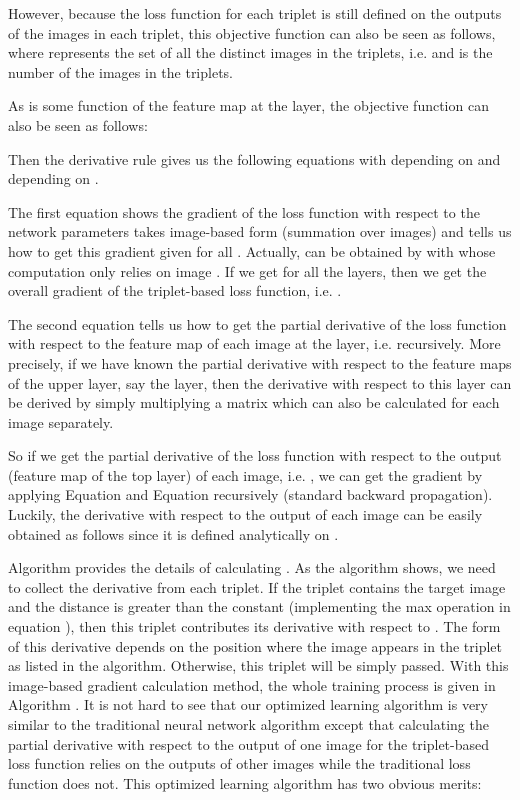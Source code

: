 \documentclass[review]{elsarticle}
\begin{document}
However, because the loss function for each triplet is still defined on the outputs of the images in each triplet, this objective function can also be seen as follows, where  represents the set of all the distinct images in the triplets, i.e.  and  is the number of the images in the triplets.


As  is some function of the feature map  at the  layer, the objective function can also be seen as follows:


Then the derivative rule gives us the following equations with  depending on  and  depending on .




The first equation shows the gradient of the loss function with respect to the network parameters takes image-based form (summation over images) and tells us how to get this gradient given  for all . Actually,  can be obtained by  with  whose computation only relies on image . If we get   for all the layers, then we get the overall gradient of the triplet-based loss function, i.e. .
 
The second equation tells us how to get the partial derivative of the loss function with respect to the feature map of each image  at the  layer, i.e.  recursively. More precisely, if we have known the partial derivative with respect to the feature maps of the upper layer, say the  layer, then the derivative with respect to this layer can be derived by simply multiplying a matrix  which can also be calculated for each image  separately.

So if we get the partial derivative of the loss function with respect to the output (feature map of the top layer) of each image, i.e. , we can get the gradient  by applying Equation  and Equation  recursively (standard backward propagation). Luckily, the derivative with respect to the output of each image can be easily obtained as follows since it is defined analytically on .
\begin{small}

\end{small}

Algorithm  provides the details of calculating . As the algorithm shows, we need to collect the derivative from each triplet. If the triplet contains the target image  and the distance  is greater than the constant  (implementing the max operation in equation ), then this triplet contributes its derivative with respect to . The form of this derivative depends on the position where the image  appears in the triplet  as listed in the algorithm. Otherwise, this triplet will be simply passed. With this image-based gradient calculation method, the whole training process is given in Algorithm . It is not hard to see that our optimized learning algorithm is very similar to the traditional neural network algorithm except that calculating the partial derivative with respect to the output of one image for the triplet-based loss function relies on the outputs of other images while the traditional loss function does not. This optimized learning algorithm has two obvious merits:
\end{document}
